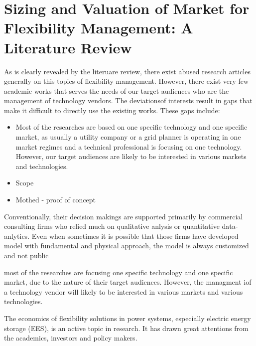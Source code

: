\chapter{Sizing and Valuation of Market for Flexibility Management: A Literature Review}
\label{ch:LitRev}


As is clearly revealed by the literuare review, there exist abused research articles generally on this topics of flexibility management. However, there exist very few academic works that serves the needs of our target audiences who are the management of technology vendors. The deviationsof interests result in gaps that make it difficult to directly use the existing works. These gaps include:

\begin{itemize}
	\item Most of the researches are based on one specific technology and one specific market, as usually a utility company or a grid planner is operating in one market regimes and a technical professional is focusing on one technology.  However, our target audiences are likely to be interested in various markets and technologies.
	\item Scope
	\item Mothed - proof of concept
\end{itemize}




Conventionally, their decision makings are supported primarily by commercial consulting firms who relied much on qualitative anlysis or quantitative data-anlytics. Even when sometimes it is possible that those firms have developed model with fundamental and physical approach, the model is always customized and not public 

most of the researches are focusing one specific technology and one specific market, due to the nature of their target audiences. However, the managment iof a technology vendor will likely to be interested in various markets and various technologies. 

The economics of flexibility solutions in power systems, especially electric energy storage (EES), is an active topic in research. It has drawn great attentions from the academics, investors and policy makers. 


